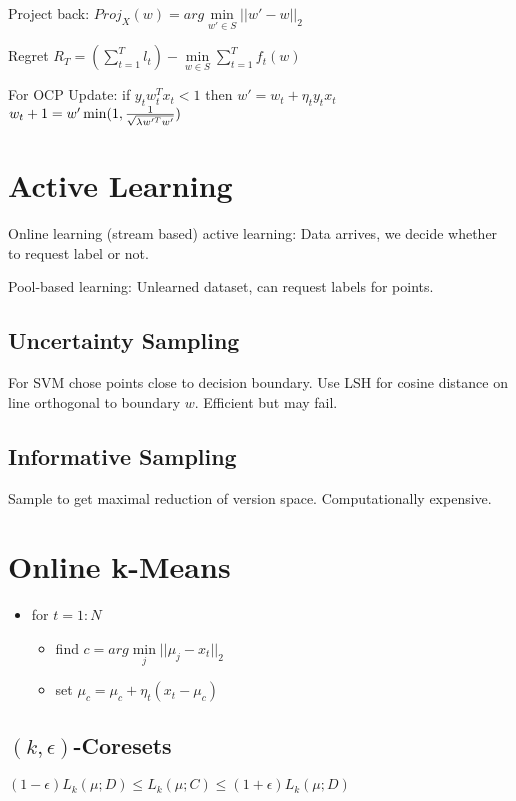 \documentclass[a4paper,11pt,twocolumn]{article}
\begin{document}
Project back: $Proj_X(w) = arg \min \limits_{w' \in S} ||w' - w||_2$

Regret $R_T = (\sum \limits_{t=1}^T l_t) - \min \limits_{w \in S} \sum \limits_{t=1}^T f_t(w)$

For OCP Update: if $y_t w_t^T x_t < 1$ then 
$w'=w_t+\eta_t y_t x_t$
$w_t+1 = w' \min (1,{{1}\over{\sqrt{\lambda w'^T w'}}})$


\section{Active Learning}
Online learning (stream based) active learning: Data arrives, we decide whether to request label or not.

Pool-based learning: Unlearned dataset, can request labels for points.

\subsection{Uncertainty Sampling}
For SVM chose points close to decision boundary. Use LSH for cosine distance on line orthogonal to boundary $w$. Efficient but may fail.

\subsection{Informative Sampling}
Sample to get maximal reduction of version space. Computationally expensive.


\section{Online k-Means}
\begin{itemize}[noitemsep,topsep=0pt,parsep=0pt,partopsep=0pt]
\item for $t=1:N$
\begin{itemize}[noitemsep,topsep=0pt,parsep=0pt,partopsep=0pt]
\item find $c = arg \min \limits_j ||\mu_j - x_t ||_2$
\item set $ \mu_c = \mu_c+ \eta_t ( x_t - \mu_c)$
\end{itemize}
\end{itemize}

\subsection{$(k,\epsilon)$-Coresets}

$(1-\epsilon)L_k(\mu;D) \leq 
L_k(\mu;C) \leq
(1+\epsilon)L_k(\mu;D)$
\end{document}
